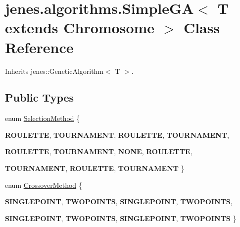 \hypertarget{classjenes_1_1algorithms_1_1_simple_g_a_3_01_t_01extends_01_chromosome_01_4}{
\section{jenes.algorithms.SimpleGA$<$ T extends Chromosome $>$ Class Reference}
\label{classjenes_1_1algorithms_1_1_simple_g_a_3_01_t_01extends_01_chromosome_01_4}
}
Inherits jenes::GeneticAlgorithm$<$ T $>$.

\subsection*{Public Types}
\begin{CompactItemize}
\item 
enum \hyperlink{classjenes_1_1algorithms_1_1_simple_g_a_3_01_t_01extends_01_chromosome_01_4_6310e8ba52593a9b9ab7809caa9ba296}{SelectionMethod} \{ \par
\textbf{ROULETTE}, 
\textbf{TOURNAMENT}, 
\textbf{ROULETTE}, 
\textbf{TOURNAMENT}, 
\par
\textbf{ROULETTE}, 
\textbf{TOURNAMENT}, 
\textbf{NONE}, 
\textbf{ROULETTE}, 
\par
\textbf{TOURNAMENT}, 
\textbf{ROULETTE}, 
\textbf{TOURNAMENT}
 \}
\item 
enum \hyperlink{classjenes_1_1algorithms_1_1_simple_g_a_3_01_t_01extends_01_chromosome_01_4_d015c6a036c7234fe34a1a78fc3c55bf}{CrossoverMethod} \{ \par
\textbf{SINGLEPOINT}, 
\textbf{TWOPOINTS}, 
\textbf{SINGLEPOINT}, 
\textbf{TWOPOINTS}, 
\par
\textbf{SINGLEPOINT}, 
\textbf{TWOPOINTS}, 
\textbf{SINGLEPOINT}, 
\textbf{TWOPOINTS}
 \}
\end{CompactItemize}
